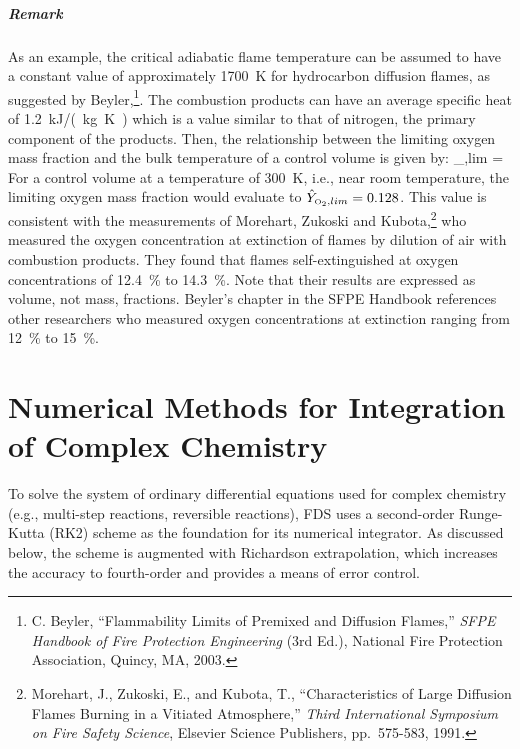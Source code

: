 \paragraph{Remark}
As an example, the critical adiabatic flame temperature can be assumed to have a constant value of approximately
1700~K for hydrocarbon diffusion flames, as suggested by Beyler,\footnote{C. Beyler, ``Flammability Limits of Premixed and Diffusion Flames,''
{\em SFPE Handbook of Fire Protection Engineering} (3rd Ed.), National Fire
Protection Association, Quincy, MA, 2003.}. The combustion products can have an average specific heat of \SI{1.2}{kJ/(kg.K)} which is a value similar to that of nitrogen, the primary component of the products. Then, the relationship between the limiting oxygen mass fraction and the bulk temperature of a control volume is given by:
\be
   _{\OTWO,lim} =  \approx  {}  \label{extinction_model}
\ee
For a control volume at a temperature of \SI{300}{K}, i.e., near room temperature, the limiting oxygen
mass fraction would evaluate to $\hat{Y}_{\text{\tiny \hbox{O}$_2$},lim}=0.128$.  This value is consistent with the measurements
of Morehart, Zukoski and Kubota,\footnote{Morehart, J., Zukoski, E., and Kubota, T., ``Characteristics of Large Diffusion Flames
Burning in a Vitiated Atmosphere,'' {\em Third International Symposium on Fire Safety
Science}, Elsevier Science Publishers, pp.~575-583, 1991.} who measured the oxygen concentration at extinction of flames by dilution of air
with combustion products. They found that flames self-extinguished at oxygen concentrations of 12.4~\% to 14.3~\%. Note that their results
are expressed as volume, not mass, fractions. Beyler's chapter in the SFPE Handbook references other researchers who measured oxygen
concentrations at extinction ranging from 12~\% to 15~\%.

\chapter{Numerical Methods for Integration of Complex Chemistry}

\label{chemistry_integration}

To solve the system of ordinary differential equations used for complex chemistry (e.g., multi-step reactions, reversible reactions), FDS uses a second-order Runge-Kutta (RK2) scheme as the foundation for its numerical integrator.  As discussed below, the scheme is augmented with Richardson extrapolation, which increases the accuracy to fourth-order and provides a means of error control.

